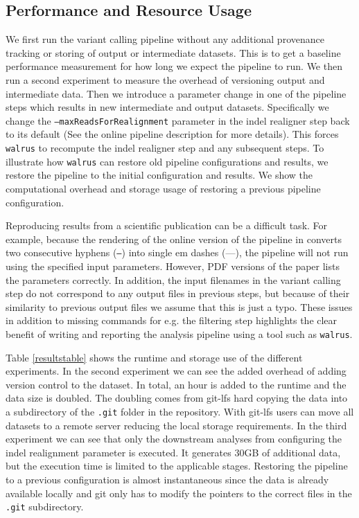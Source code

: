 \subsection{Performance and Resource Usage}
We first run the variant calling pipeline without any additional provenance
tracking or storing of output or intermediate datasets. This is to get a
baseline performance measurement for how long we expect the pipeline to run. We
then run a second experiment to measure the overhead of versioning output and
intermediate data. Then we introduce a parameter change in one of the pipeline
steps which results in new intermediate and output datasets. Specifically we
change the \texttt{--maxReadsForRealignment} parameter in the indel realigner
step back to its default (See the online pipeline description for more details).
This forces \texttt{walrus} to recompute the indel realigner step and any
subsequent steps.  To illustrate how \texttt{walrus} can restore old pipeline
configurations and results, we restore the pipeline to the initial configuration
and results. We show the computational overhead and storage usage of restoring a
previous pipeline configuration. 

Reproducing results from a scientific publication can be a difficult task. For
example, because the rendering of the online version of the pipeline in
\cite{cornish2015comparison} converts two consecutive hyphens (\texttt{--})
into single em dashes (---), the pipeline will not run using the specified input
parameters. However, PDF versions of the paper lists the parameters correctly.
In addition, the input filenames in the variant calling step do not correspond
to any output files in previous steps, but because of their similarity to
previous output files we assume that this is just a typo.  These issues in
addition to missing commands for e.g. the filtering step highlights the clear
benefit of writing and reporting the analysis pipeline using a tool such as
\texttt{walrus}. 

Table \ref{resultstable} shows the runtime and storage use of the different
experiments. In the second experiment we can see the added overhead of adding
version control to the dataset. In total, an hour is added to the runtime and
the data size is doubled. The doubling comes from git-lfs hard copying the data
into a subdirectory of the \texttt{.git} folder in the repository. With git-lfs
users can move all datasets to a remote server reducing the local storage
requirements. 
In the third experiment we can see that only the downstream analyses from
configuring the indel realignment parameter is executed. It generates 30GB of
additional data, but the execution time is limited to the applicable stages.
Restoring the pipeline to a previous configuration is almost instantaneous since
the data is already available locally and git only has to modify the pointers to
the correct files in the \texttt{.git} subdirectory. 

